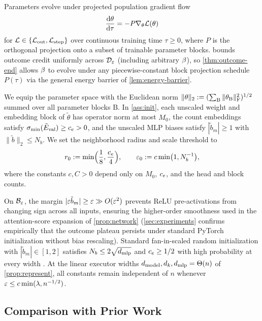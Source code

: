 \begin{definition}
\label{ass:gd}
Parameters evolve under projected population gradient flow
\[
 \ddtau{\theta} = -P\nabla_\theta\mathcal L(\theta)
\]
for $\mathcal L \in \{\mathcal L_{\mathrm{out}}, \mathcal L_{\mathrm{step}}\}$ over continuous training time $\tau \ge 0$, where $P$ is the orthogonal projection onto a subset of trainable parameter blocks.  bounds outcome credit uniformly across $\mathcal D_{\varepsilon}$ (including arbitrary $\beta$), so \cref{thm:outcome-end} allows $\beta$ to evolve under any piecewise-constant block projection schedule $P(\tau)$ via the general energy barrier of \cref{lem:energy-barrier}.
\end{definition}

\begin{remark}
\label{rem:norms}
\label{rem:end-width}
We equip the parameter space with the Euclidean norm $\|\theta\|_2 := (\sum_{\mathrm B} \|\theta_{\mathrm B}\|_{\mathrm{F}}^2)^{1/2}$ summed over all parameter blocks $\mathrm B$. In \cref{ass:init}, each unscaled weight and embedding block of $\tilde\theta$ has operator norm at most $M_0$, the count embeddings satisfy $\sigma_{\min}(\tilde E_{\mathrm{val}}) \ge c_e > 0$, and the unscaled MLP biases satisfy $|\tilde b_m| \ge 1$ with $\|\tilde b\|_2 \le N_b$. We set the neighborhood radius and scale threshold to
\[
 r_0 := \min\Bigl(\frac{1}{8}, \frac{c_e}{4}\Bigr), \qquad \varepsilon_0 := c\min\bigl(1, N_b^{-1}\bigr),
\]
where the constants $c, C > 0$ depend only on $M_0$, $c_e$, and the head and block counts.

On $\mathcal B_{\varepsilon}$, the margin $|\varepsilon\tilde b_m| \ge \varepsilon \gg O(\varepsilon^2)$ prevents ReLU pre-activations from changing sign across all inputs, ensuring the higher-order smoothness used in the attention-score expansion of \cref{prop:network} (\cref{sec:experiments} confirms empirically that the outcome plateau persists under standard PyTorch initialization without bias rescaling). Standard fan-in-scaled random initialization with $|\tilde b_m| \in [1,2]$ satisfies $N_b \le 2\sqrt{d_{\mathrm{mlp}}}$ and $c_e \ge 1/2$ with high probability at every width \citep{vershynin2018high}. At the linear executor widths $d_{\mathrm{model}}, d_k, d_{\mathrm{mlp}} = \Theta(n)$ of \cref{prop:represent}, all constants remain independent of $n$ whenever $\varepsilon \le c\min(\lambda, n^{-1/2})$.
\end{remark}

\subsection{Comparison with Prior Work}

